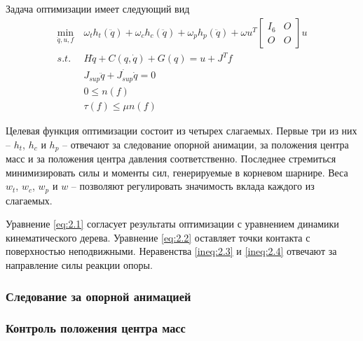Задача оптимизации имеет следующий вид
\begin{align*}
  \min_{\ddot{q}, u, f} &\ \omega_{t} h_{t}(\ddot{q}) + \omega_{c} h_{c}(\ddot{q}) + \omega_{p} h_{p}(\ddot{q}) + \omega u^{T} \begin{bmatrix} I_{6} & O \\ O & O \end{bmatrix} u \\
  s.t. &\ H \ddot{q} + C(q, \dot{q}) + G(q) = u + J^{T} f \tag{2.1}\label{eq:2.1} \\
       &\ J_{sup} \ddot{q} + \dot{J_{sup}} \dot{q} = 0 \tag{2.2}\label{eq:2.2} \\
       &\ 0 \le n(f) \tag{2.3}\label{ineq:2.3} \\
       &\ \tau(f) \le \mu n(f) \tag{2.4}\label{ineq:2.4}
\end{align*}

Целевая функция оптимизации состоит из четырех слагаемых. Первые три из них -- $h_{t}$, $h_{c}$ и $h_{p}$ -- отвечают за следование опорной анимации, за положения центра масс и за положения центра давления соответственно. Последнее стремиться минимизировать силы и моменты сил, генерируемые в корневом шарнире. Веса $w_{t}$, $w_{c}$, $w_{p}$ и $w$ -- позволяют регулировать значимость вклада каждого из слагаемых.

Уравнение \ref{eq:2.1} согласует результаты оптимизации с уравнением динамики кинематического дерева. Уравнение \ref{eq:2.2} оставляет точки контакта с поверхностью неподвижными. Неравенства \ref{ineq:2.3} и \ref{ineq:2.4} отвечают за направление силы реакции опоры.


\subsubsection{Следование за опорной анимацией}


\subsubsection{Контроль положения центра масс}



